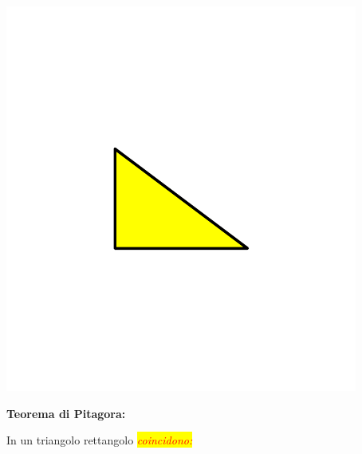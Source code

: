 \documentclass[italian,landscape]{report}
\newcommand{\rosso}[1]{\textcolor{red}{#1}}
\newcommand{\sfondogiallo}[1]{\colorbox{yellow}{#1}}
\begin{document}
\begin{center}
\includegraphics[scale=1.2]{pitagora1}
\end{center}

\begin{firstheadlineitemize}

\item \textbf{Teorema di Pitagora:}

\begin{secondheadlineitemize}

\item  In un triangolo rettangolo \sfondogiallo{\rosso{\textit{coincidono:}}}

\end{secondheadlineitemize}

\end{firstheadlineitemize}

\newframe
\end{document}
